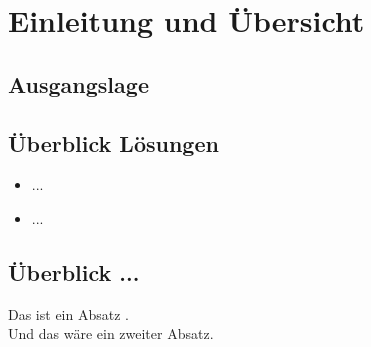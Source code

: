 \section{Einleitung und Übersicht}

\subsection{Ausgangslage}

\subsection{Überblick Lösungen}
\begin{itemize}
    \item ...
    \item ...
\end{itemize}

\subsection{Überblick ...}
Das ist ein Absatz \cite{good}. \\

Und das wäre ein zweiter Absatz. \cite{good}
